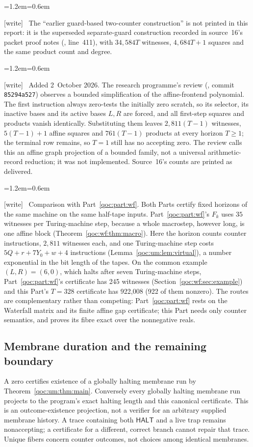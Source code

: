 \documentclass[11pt,letterpaper]{article}
\theoremstyle{definition}
\theoremstyle{remark}
\newcommand{\HALT}{\mathsf{HALT}}
\newcommand{\wtag}{\textup{[write]}}
\newenvironment{writenote}{\par\smallskip\begin{list}{}{\leftmargin=1.2em\rightmargin=0.6em}\item[]\small\wtag\ }{\end{list}\smallskip}
\begin{document}
\begin{writenote}
The ``earlier guard-based two-counter construction'' is not printed in this report: it is the superseded separate-guard construction recorded in source~16's packet proof notes (, line~411), with $34{,}584T$ witnesses, $4{,}684T+1$ squares and the same product count and degree.
\end{writenote}


\begin{writenote}
Added 2~October 2026. The research programme's review (, commit \texttt{85294a527}) observes a bounded simplification of the affine-frontend polynomial. The first instruction always zero-tests the initially zero scratch, so its selector, its inactive bases and its active bases $L,R$ are forced, and all first-step squares and products vanish identically. Substituting them leaves $2{,}811(T-1)$ witnesses, $5(T-1)+1$ affine squares and $761(T-1)$ products at every horizon $T\ge1$; the terminal row remains, so $T=1$ still has no accepting zero. The review calls this an affine graph projection of a bounded family, not a universal arithmetic-record reduction; it was not implemented. Source~16's counts are printed as delivered.
\end{writenote}


\begin{writenote}
Comparison with Part~\ref{qoc:part:wf}. Both Parts certify fixed horizons of the same machine on the same half-tape inputs. Part~\ref{qoc:part:wf}'s $F_k$ uses $35$ witnesses per Turing-machine step, because a whole macrostep, however long, is one affine block (Theorem~\ref{qoc:wf:thm:macro}). Here the horizon counts counter instructions, $2{,}811$ witnesses each, and one Turing-machine step costs $5Q+r+7Y_0+w+4$ instructions (Lemma~\ref{qoc:um:lem:virtual}), a number exponential in the bit length of the tapes. On the common example $(L,R)=(6,0)$, which halts after seven Turing-machine steps, Part~\ref{qoc:part:wf}'s certificate has 245 witnesses (Section~\ref{qoc:wf:sec:example}) and this Part's $T=328$ certificate has 922,008 (922 of them nonzero). The routes are complementary rather than competing: Part~\ref{qoc:part:wf} rests on the Waterfall matrix and its finite affine gap certificate; this Part needs only counter semantics, and proves its fibre exact over the nonnegative reals.
\end{writenote}


\subsection{Membrane duration and the remaining boundary}
A zero certifies existence of a globally halting membrane run by Theorem~\ref{qoc:um:thm:main}. Conversely every globally halting membrane run projects to the program's exact halting length and this canonical certificate. This is an outcome-existence projection, not a verifier for an arbitrary supplied membrane history. A trace containing both $\HALT$ and a live trap remains nonaccepting; a certificate for a different, correct branch cannot repair that trace. Unique fibers concern counter outcomes, not choices among identical membranes.
\end{document}

